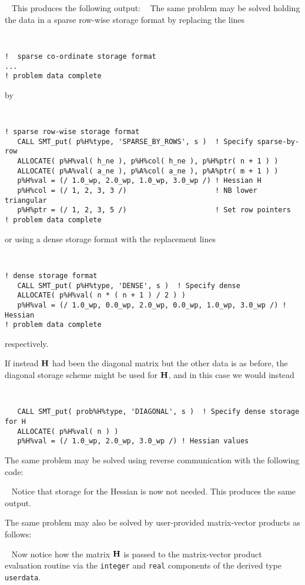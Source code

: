 \documentclass{galahad}
\begin{document}
{\tt \small
\VerbatimInput{\packageexample}
}
\noindent
This produces the following output:
{\tt \small
\VerbatimInput{\packageresults}
}
\noindent
The same problem may be solved holding the data in
a sparse row-wise storage format by replacing the lines
{\tt \small
\begin{verbatim}
!  sparse co-ordinate storage format
...
! problem data complete
\end{verbatim}
}
\noindent
by
{\tt \small
\begin{verbatim}
! sparse row-wise storage format
   CALL SMT_put( p%H%type, 'SPARSE_BY_ROWS', s )  ! Specify sparse-by-row
   ALLOCATE( p%H%val( h_ne ), p%H%col( h_ne ), p%H%ptr( n + 1 ) )
   ALLOCATE( p%A%val( a_ne ), p%A%col( a_ne ), p%A%ptr( m + 1 ) )
   p%H%val = (/ 1.0_wp, 2.0_wp, 1.0_wp, 3.0_wp /) ! Hessian H
   p%H%col = (/ 1, 2, 3, 3 /)                     ! NB lower triangular
   p%H%ptr = (/ 1, 2, 3, 5 /)                     ! Set row pointers
! problem data complete
\end{verbatim}
}
\noindent
or using a dense storage format with the replacement lines
{\tt \small
\begin{verbatim}
! dense storage format
   CALL SMT_put( p%H%type, 'DENSE', s )  ! Specify dense
   ALLOCATE( p%H%val( n * ( n + 1 ) / 2 ) )
   p%H%val = (/ 1.0_wp, 0.0_wp, 2.0_wp, 0.0_wp, 1.0_wp, 3.0_wp /) ! Hessian
! problem data complete
\end{verbatim}
}
\noindent
respectively.

If instead ${\mathbf{H}}$ had been the diagonal matrix
but the other data is as before, the diagonal storage scheme
might be used for ${\mathbf{H}}$, and in this case we would instead
{\tt \small
\begin{verbatim}
   CALL SMT_put( prob%H%type, 'DIAGONAL', s )  ! Specify dense storage for H
   ALLOCATE( p%H%val( n ) )
   p%H%val = (/ 1.0_wp, 2.0_wp, 3.0_wp /) ! Hessian values
\end{verbatim}
}
\noindent

The same problem may be solved using reverse communication with the
following code:

{\tt \small
\VerbatimInput{\packageexampleb}
}
\noindent
Notice that storage for the Hessian is now not needed.
This produces the same output.

The same problem may also be solved by user-provided matrix-vector
products as follows:

{\tt \small
\VerbatimInput{\packageexamplec}
}
\noindent
Now notice how the matrix ${\mathbf{H}}$ is passed to the matrix-vector product
evaluation routine via the {\tt integer} and
{\tt real} components of the derived type {\tt userdata}.

\end{document}

